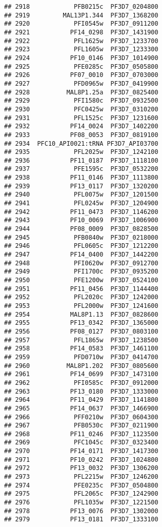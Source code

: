 \documentclass{article}\usepackage[]{graphicx}\usepackage[]{color}
\makeatletter
\newenvironment{kframe}{%
 \def\at@end@of@kframe{}%
 \ifinner\ifhmode%
  \def\at@end@of@kframe{\end{minipage}}%
  \begin{minipage}{\columnwidth}%
 \fi\fi%
 \def\FrameCommand##1{\hskip\@totalleftmargin \hskip-\fboxsep
 \colorbox{shadecolor}{##1}\hskip-\fboxsep
     \hskip-\linewidth \hskip-\@totalleftmargin \hskip\columnwidth}%
 \MakeFramed {\advance\hsize-\width
   \@totalleftmargin\z@ \linewidth\hsize
   \@setminipage}}%
 {\par\unskip\endMakeFramed%
 \at@end@of@kframe}
\newenvironment{knitrout}{}{} %
\makeatother
\begin{document}
\begin{knitrout}
\begin{kframe}
\begin{verbatim}
## 2918            PFB0215c  PF3D7_0204800
## 2919         MAL13P1.344  PF3D7_1368200
## 2920            PFI0545w  PF3D7_0911200
## 2921           PF14_0298  PF3D7_1431900
## 2922            PFL1625w  PF3D7_1233700
## 2923            PFL1605w  PF3D7_1233300
## 2924           PF10_0146  PF3D7_1014900
## 2925            PFE0285c  PF3D7_0505800
## 2926           PF07_0010  PF3D7_0703000
## 2927            PFD0965w  PF3D7_0419900
## 2928          MAL8P1.25a  PF3D7_0825400
## 2929            PFI1580c  PF3D7_0932500
## 2930            PFC0425w  PF3D7_0310200
## 2931            PFL1525c  PF3D7_1231600
## 2932           PF14_0024  PF3D7_1402200
## 2933           PF08_0053  PF3D7_0819100
## 2934  PFC10_API0021:tRNA PF3D7_API03700
## 2935            PFL2025w  PF3D7_1242100
## 2936           PF11_0187  PF3D7_1118100
## 2937            PFE1595c  PF3D7_0532200
## 2938           PF11_0146  PF3D7_1113800
## 2939           PF13_0117  PF3D7_1320200
## 2940            PFL0075w  PF3D7_1201500
## 2941            PFL0245w  PF3D7_1204900
## 2942           PF11_0473  PF3D7_1146200
## 2943           PF10_0069  PF3D7_1006900
## 2944           PF08_0009  PF3D7_0828500
## 2945            PFB0840w  PF3D7_0218000
## 2946            PFL0605c  PF3D7_1212200
## 2947           PF14_0400  PF3D7_1442200
## 2948            PFI0620w  PF3D7_0912700
## 2949            PFI1700c  PF3D7_0935200
## 2950            PFE1200w  PF3D7_0524100
## 2951           PF11_0456  PF3D7_1144400
## 2952            PFL2020c  PF3D7_1242000
## 2953            PFL2000w  PF3D7_1241600
## 2954           MAL8P1.13  PF3D7_0828600
## 2955           PF13_0342  PF3D7_1365000
## 2956           PF08_0127  PF3D7_0803100
## 2957            PFL1865w  PF3D7_1238500
## 2958           PF14_0583  PF3D7_1461100
## 2959            PFD0710w  PF3D7_0414700
## 2960          MAL8P1.202  PF3D7_0805600
## 2961           PF14_0699  PF3D7_1473100
## 2962            PFI0585c  PF3D7_0912000
## 2963           PF13_0180  PF3D7_1333000
## 2964           PF11_0429  PF3D7_1141800
## 2965           PF14_0637  PF3D7_1466900
## 2966            PFF0210w  PF3D7_0604300
## 2967            PFB0530c  PF3D7_0211900
## 2968           PF11_0246  PF3D7_1123500
## 2969            PFC1045c  PF3D7_0323400
## 2970           PF14_0171  PF3D7_1417300
## 2971           PF10_0242  PF3D7_1024800
## 2972           PF13_0032  PF3D7_1306200
## 2973            PFL2215w  PF3D7_1246200
## 2974            PFE0235c  PF3D7_0504800
## 2975            PFL2065c  PF3D7_1242900
## 2976            PFL1035w  PF3D7_1221500
## 2978           PF13_0076  PF3D7_1302000
## 2979           PF13_0181  PF3D7_1333100

\end{verbatim}
\end{kframe}
\end{knitrout}
\end{document}
